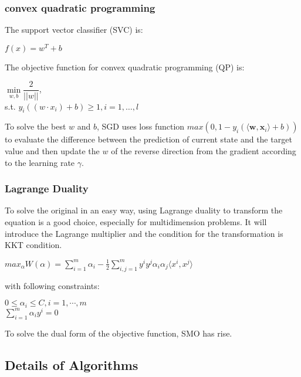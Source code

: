 \documentclass[9pt,shortpaper,twoside,web]{ieeecolor}
\begin{document}
\subsubsection{convex quadratic programming}
The support vector classifier (SVC) is:
\begin{center}
$f(x) = w^{T} + b$
\end{center}
The objective function for convex quadratic programming (QP) is: 
\begin{center}
$\min\limits_{w, b}\dfrac{2}{\vert\vert w\vert\vert}$, \\[10pt]
s.t. $y_i((w\cdot x_i)+b)\geq 1, i=1,\dotsc, l $
\bigskip
\end{center}
To solve the best $w$ and $b$, SGD uses loss function $max(0, 1-y_i(\langle\textbf{w}, \textbf{x}_i\rangle + b))$ to evaluate the difference between the prediction of current state and the target value and then update the $w$ of the reverse direction from the gradient according to the learning rate $\gamma$. \cite{tutorial}
\bigskip 
\subsubsection{Lagrange Duality}
To solve the original in an easy way, using Lagrange duality to transform the equation is a good choice, especially for multidimension problems. \cite{tutorial} It will introduce the Lagrange multiplier and the condition for the transformation is KKT condition.\\
\begin{center}
$max_\alpha \textit{W}(\alpha) = \sum_{i=1}^{m} \alpha_i - \frac{1}{2}\sum_{i, j = 1}^{m} y^{i}y^{j}\alpha_i\alpha_j\langle x^{i},x^{j}\rangle$
\end{center}
\bigskip with following constraints:\\
\begin{center}
$0\leq \alpha_i\leq C, i = 1, \cdots, m$\\[10pt]
$\sum_{i=1}^{m} \alpha_iy^{i} = 0$
\end{center}
\bigskip
To solve the dual form of the objective function, SMO has rise. 
\subsection{Details of Algorithms}
\end{document}
